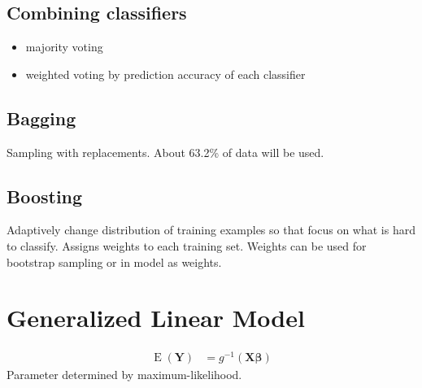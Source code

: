\documentclass{article}
\begin{document}
\subsection{Combining classifiers}
\begin{itemize}
\item majority voting
\item weighted voting by prediction accuracy of each classifier
\end{itemize}

\subsection{Bagging}
Sampling with replacements. About 63.2\% of data will be used.

\subsection{Boosting}
Adaptively change distribution of training examples so that focus on what is hard to classify. Assigns weights to each training set. Weights can be used for bootstrap sampling or in model as weights.

\section{Generalized Linear Model}
\begin{align*}
\operatorname{E}(\mathbf{Y})&=g^{-1}(\mathbf{X}\mathbf{\beta})
\end{align*}
Parameter determined by maximum-likelihood.
\end{document}
